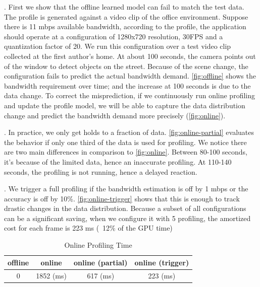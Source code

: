 . First we show that the offline
learned model can fail to match the test data. The profile is generated against
a video clip of the office environment. Suppose there is 11 mbps available
bandwidth, according to the profile, the application should operate at a
configuration of 1280x720 resolution, 30FPS and a quantization factor of 20. We
run this configuration over a test video clip collected at the first author's
home. At about 100 seconds, the camera points out of the window to detect
objects on the street. Because of the scene change, the configuration fails to
predict the actual bandwidth demand. \autoref{fig:offline} shows the bandwidth
requirement over time; and the increase at 100 seconds is due to the data
change. To correct the misprediction, if we continuously run online profiling
and update the profile model, we will be able to capture the data distribution
change and predict the bandwidth demand more precisely (\autoref{fig:online}).

. In practice, we only get holds
to a fraction of data. \autoref{fig:online-partial} evaluates the behavior if
only one third of the data is used for profiling. We notice there are two main
differences in comparison to \autoref{fig:online}. Between 80-100 seconds, it's
because of the limited data, hence an inaccurate profiling. At 110-140 seconds,
the profiling is not running, hence a delayed reaction.

. We trigger a full profiling if the bandwidth
estimation is off by 1 mbps or the accuracy is off by
10\%. \autoref{fig:online-trigger} shows that this is enough to track drastic
changes in the data distribution. Because a subset of all configurations can be
a significant saving, when we configure it with 5 profiling, the amortized cost
for each frame is 223 ms (~12\% of the GPU time)


\begin{table}[t]
  \centering
  \begin{tabular}{c|c|c|c}
    \hline
    offline & online & online (partial) & online (trigger) \\
    \hline
    0       & 1852 (ms)   & 617 (ms)              & 223 (ms) \\
    \hline
  \end{tabular}
  \caption{Online Profiling Time}
  \label{tab:online}
\end{table}


